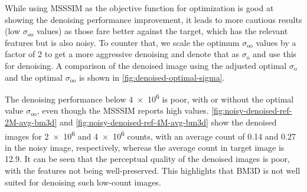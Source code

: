 While using \gls{MSSSIM} as the objective function for optimization is good at showing the denoising performance improvement, it leads to more cautious results (low $\sigma_{\text{oo}}$ values) as those fare better against the target, which has the relevant features but is also noisy. To counter that, we scale the optimum $\sigma_{\text{oo}}$ values by a factor of 2 to get a more aggressive denoising and denote that as $\sigma_{\text{o}}$ and use this for denoising. A comparison of the denoised image using the adjusted optimal $\sigma_{\text{o}}$ and the optimal $\sigma_{\text{oo}}$ is shown in \cref{fig:denoised-optimal-sigma}.

The denoising performance below \num{4e6}  is poor, with or without the optimal value $\sigma_{\text{oo}}$, even though the \gls{MSSSIM} reports high values. \cref{fig:noisy-denoised-ref-2M-avg-bm3d} and \cref{fig:noisy-denoised-ref-4M-avg-bm3d} show the denoised images for \num{2e6} and \num{4e6} counts, with an average count of \num{0.14} and \num{0.27}  in the noisy image, respectively, whereas the average count in target image is \num{12.9}. It can be seen that the perceptual  quality of the denoised images is poor, with the features not being well-preserved. This highlights that \gls{BM3D} is not well suited for denoising such low-count images.

